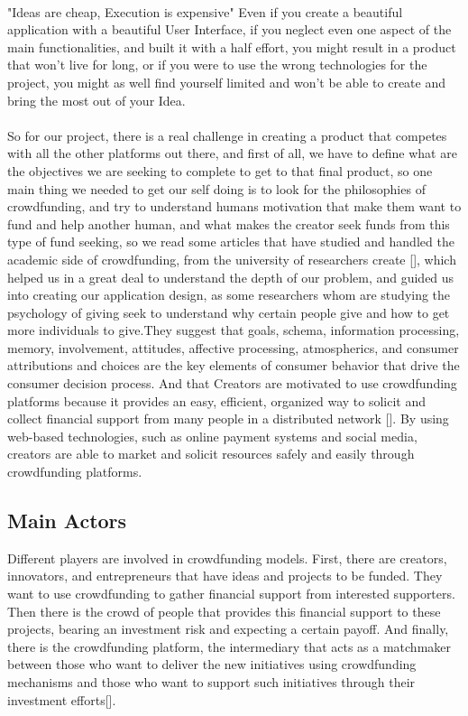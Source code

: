\paragraph*{}
"Ideas are cheap, Execution is expensive" Even if you create a beautiful application with a beautiful User Interface, if you neglect even one aspect of the main functionalities, and built it with a half effort, you might result in a product that won't live for long, or if you were to use the wrong technologies for the project, you might as well find yourself limited and won't be able to create and bring the most out of your Idea.
\paragraph*{}
So for our project, there is a real challenge in creating a product that competes with all the other platforms out there,
and first of all, we have to define what are the objectives we are seeking to complete to get to that final product,
so one main thing we needed to get our self doing is to look for the philosophies of crowdfunding, and try to understand humans motivation that make them want to fund and help another human, and what makes the creator seek funds from this type of fund seeking,
so we read some articles that have studied and handled the academic side of crowdfunding, from the university of  researchers create [\cite{inproceedings}], which helped us in a great deal to understand the depth of our problem, and guided us into creating our application design, as some researchers whom are studying the psychology of giving seek to understand why certain people give and how to get more individuals to give.They suggest that goals, schema, information processing, memory, involvement, attitudes, affective processing, atmospherics, and consumer attributions and choices are the key elements of consumer behavior that drive the consumer decision process.
And that Creators are motivated to use crowdfunding platforms because it provides an easy, efficient, organized way to solicit and collect financial support from many people in a distributed network [\cite{crowdMotiv}]. By using web-based technologies, such as online payment systems and social media, creators are able to market and solicit resources safely and easily through crowdfunding platforms.
\\
\subsection{Main Actors}
Different players are involved in crowdfunding models. First, there are creators, innovators, and entrepreneurs that have ideas and
projects to be funded. They want to use crowdfunding to gather financial support from interested supporters.
Then there is the crowd of people that provides this financial support to these projects, bearing an investment
risk and expecting a certain payoff. And finally, there is the crowdfunding platform, the intermediary that acts
as a matchmaker between those who want to deliver the new initiatives using crowdfunding mechanisms
and those who want to support such initiatives through their investment efforts[\cite{crwdfun:transform}].
